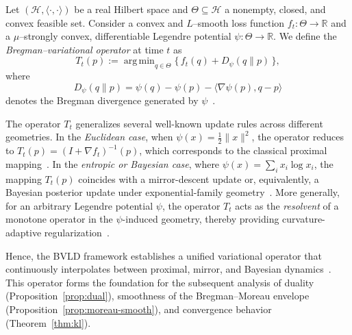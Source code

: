 \documentclass[11pt]{article}
\newcommand{\inner}[2]{\langle #1 , #2 \rangle}
\DeclareMathOperator*{\argmin}{arg\,min}
\theoremstyle{plain}
\theoremstyle{definition}
\theoremstyle{remark}
\begin{document}

Let $(\mathcal H,\inner{\cdot}{\cdot})$ be a real Hilbert space and 
$\Theta\subseteq\mathcal H$ a nonempty, closed, and convex feasible set.  
Consider a convex and $L$--smooth loss function $f_t:\Theta\to\mathbb R$ 
and a $\mu$--strongly convex, differentiable Legendre potential 
$\psi:\Theta\to\mathbb R$.  
We define the \emph{Bregman--variational operator} at time $t$ as
\begin{equation}
T_t(p)
:=\argmin_{q\in\Theta}\bigl\{\,f_t(q)+D_\psi(q\|p)\,\bigr\},
\label{eq:operator}
\end{equation}
where 
\[
D_\psi(q\|p)
=\psi(q)-\psi(p)-\inner{\nabla\psi(p)}{q-p}
\]
denotes the Bregman divergence generated by $\psi$~\cite{Bregman1967,Bauschke2017}.


The operator $T_t$ generalizes several well-known update rules across different geometries. 
In the \textit{Euclidean case}, when $\psi(x)=\tfrac{1}{2}\|x\|^2$, 
the operator reduces to $T_t(p)=(I+\nabla f_t)^{-1}(p)$, 
which corresponds to the classical proximal mapping~\cite{Rockafellar1976,Parikh2014}. 
In the \textit{entropic or Bayesian case}, where $\psi(x)=\sum_i x_i\log x_i$, 
the mapping $T_t(p)$ coincides with a mirror-descent update or, equivalently, 
a Bayesian posterior update under exponential-family geometry~\cite{Beck2003,Amari2016,Lu2021}. 
More generally, for an arbitrary Legendre potential $\psi$, 
the operator $T_t$ acts as the \emph{resolvent} of a monotone operator 
in the $\psi$-induced geometry, thereby providing curvature-adaptive 
regularization~\cite{Bauschke2019,Combettes2021}.

Hence, the BVLD framework establishes a unified variational operator
that continuously interpolates between proximal, mirror, and 
Bayesian dynamics~\cite{Bolte2018,Lu2021,Hsieh2023}.  
This operator forms the foundation for the subsequent analysis of 
duality (Proposition~\ref{prop:dual}),  
smoothness of the Bregman--Moreau envelope (Proposition~\ref{prop:moreau-smooth}),  
and convergence behavior (Theorem~\ref{thm:kl}).


\end{document}
